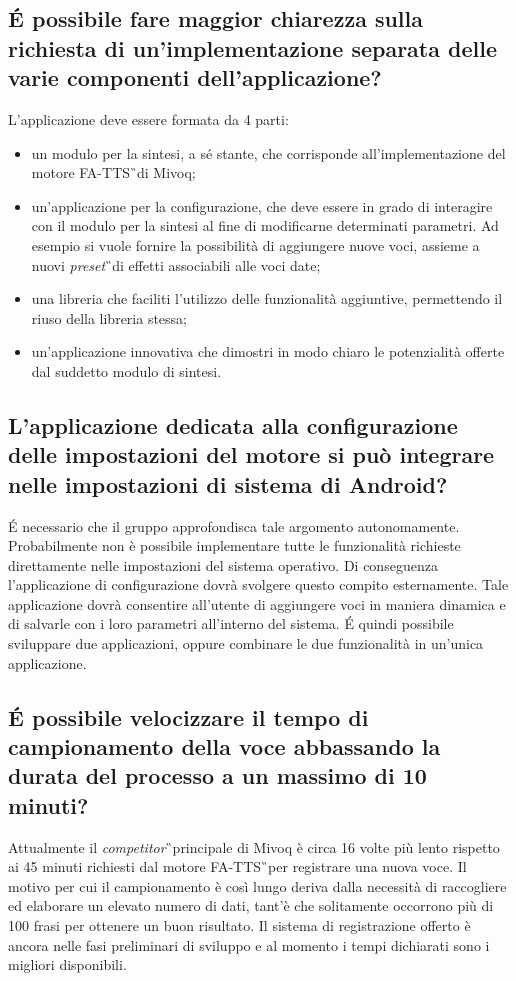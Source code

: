 \subsection{\'E possibile fare maggior chiarezza sulla richiesta di 
un'implementazione separata delle varie componenti dell'applicazione?}
L'applicazione deve essere formata da 4 parti:
\begin{itemize}
	\item un modulo per la sintesi, a sé stante, che corrisponde 
	all'implementazione del motore FA-TTS\G\ di Mivoq;
	\item un'applicazione per la configurazione, che deve essere in grado di 
	interagire con il modulo per la sintesi al fine di modificarne determinati 
	parametri. Ad esempio si vuole fornire la possibilità di aggiungere nuove 
	voci, assieme a nuovi \textit{preset}\G\ di effetti associabili alle voci 
	date;
	\item una libreria che faciliti l'utilizzo delle funzionalità aggiuntive, 
	permettendo il riuso della libreria stessa;
	\item un'applicazione innovativa che dimostri in modo chiaro le 
	potenzialità offerte dal suddetto modulo di sintesi.
\end{itemize}


\subsection{L'applicazione dedicata alla configurazione delle impostazioni del 
motore si può integrare nelle impostazioni di sistema di Android?}
\'E necessario che il gruppo approfondisca tale argomento autonomamente. 
Probabilmente non è possibile implementare tutte le funzionalità richieste 
direttamente nelle impostazioni del sistema operativo. Di conseguenza 
l'applicazione di configurazione dovrà svolgere questo compito esternamente. 
Tale applicazione dovrà consentire all'utente di aggiungere voci in maniera 
dinamica e di salvarle con i loro parametri all'interno del sistema. \'E quindi 
possibile sviluppare due applicazioni, oppure combinare le due funzionalità in 
un'unica applicazione.

\subsection{\'E possibile velocizzare il tempo di campionamento della voce 
abbassando la durata del processo a un massimo di 10 minuti?}
Attualmente il \textit{competitor}\G\ principale di Mivoq è circa 16 
volte più lento rispetto ai 45 minuti richiesti dal motore FA-TTS\G\ per 
registrare una nuova voce. Il motivo per cui il campionamento è così lungo 
deriva dalla necessità di raccogliere ed elaborare un elevato numero di dati, 
tant'è che solitamente occorrono più di 100 frasi per ottenere un buon 
risultato. Il sistema di registrazione offerto è ancora nelle fasi preliminari 
di sviluppo e al momento i tempi dichiarati sono i migliori disponibili.

